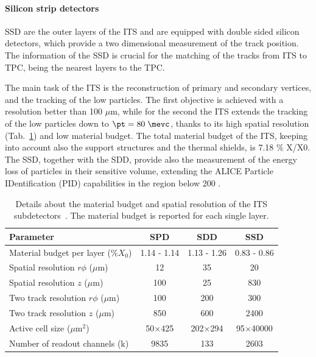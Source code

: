 \paragraph{Silicon strip detectors}
SSD are the outer layers of the ITS and are equipped with double sided silicon detectors, which
provide a two dimensional measurement of the track position.
The information of the SSD is crucial for the matching of the tracks from ITS to TPC, being the
nearest layers to the TPC.

The main task of the ITS is the reconstruction of primary and secondary vertices, and the tracking
of the low \pt particles.
The first objective is achieved with a resolution better than 100 $\mu$m, while for the second the
ITS extends the tracking of the low \pt particles down to $\pt = 80 \; \mevc$, thanks to its high
spatial resolution (Tab.~\ref{tab:its}) and low material budget.
The total material budget of the ITS, keeping into account also the support structures and the 
thermal shields, is 7.18 \% X/X0.
The SSD, together with the SDD, provide also the measurement of the energy loss of particles 
in their sensitive volume, extending the ALICE Particle IDentification (PID) capabilities in the
 \pt region below 200 \mevc.

\begingroup
\renewcommand{\arraystretch}{1.2} %
\begin{table}
\centering
\begin{tabular}{lccc}
\textbf{Parameter}                      &  \textbf{SPD} & \textbf{SDD}  & \textbf{SSD} \\
\midrule
Material budget per layer (\%$X_{0}$)   &  1.14 - 1.14  &  1.13 - 1.26  &  0.83 - 0.86 \\
Spatial resolution $r\phi$ ($\mu$m)     &       12      &       35      &       20     \\
Spatial resolution $z$ ($\mu$m)         &       100     &       25      &      830     \\
Two track resolution $r\phi$ ($\mu$m)   &       100     &      200      &      300     \\
Two track resolution $z$ ($\mu$m)       &       850     &      600      &     2400     \\
Active cell size ($\mu$m$^2$)           & 50$\times$425 & 202$\times$294& 95$\times$40000 \\
Number of readout channels (k)          &      9835     &      133      &     2603     \\
\midrule
\end{tabular}
\vspace{2pt}
\caption{Details about the material budget and spatial resolution of the ITS subdetectors~\cite{alicemulti}. The material budget is reported for each single layer.}
\label{tab:its}
\end{table}
\endgroup


